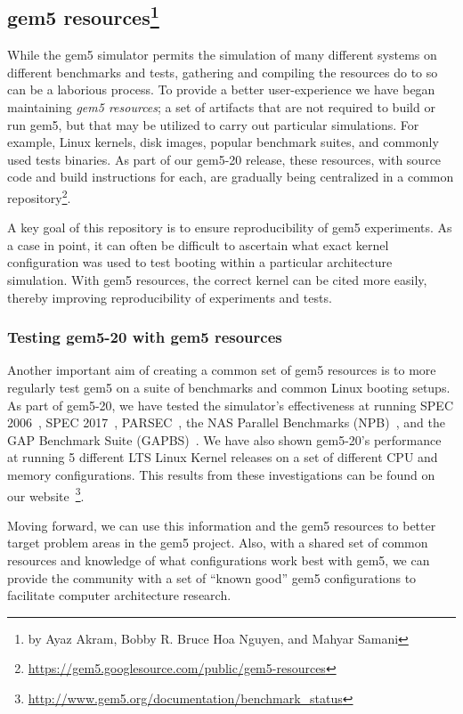 \subsection[gem5 resources]{gem5 resources\footnote{by Ayaz Akram, Bobby R. Bruce Hoa Nguyen, and Mahyar Samani}}
\label{sec:resources}

While the gem5 simulator permits the simulation of many different systems on
different benchmarks and tests, gathering and compiling the resources do to so
can be a laborious process. To provide
a better user-experience we have began maintaining \emph{gem5
resources}; a set of artifacts
that are not required to build or run gem5, but that may be utilized to carry out
particular simulations. For example, Linux kernels, disk images, popular
benchmark suites, and commonly used tests binaries. As part of our gem5-20
release, these resources, with source code and build instructions for each, are
gradually being centralized in a common repository\footnote{
\url{https://gem5.googlesource.com/public/gem5-resources}}.

A key goal of this repository is to ensure reproducibility of gem5
experiments. As a case in point, it can often be difficult to ascertain what exact
kernel configuration was used to test booting within a particular architecture
simulation. With gem5 resources, the correct kernel can be cited more easily,
thereby improving reproducibility of experiments and tests.

\subsubsection{Testing gem5-20 with gem5 resources}

Another important aim of creating a common set of gem5 resources is to more
regularly test gem5 on a suite of benchmarks and common Linux booting setups.
As part of gem5-20, we have tested the simulator's effectiveness
at running SPEC 2006~\cite{spec06}, SPEC 2017~\cite{spec17},
PARSEC~\cite{parsec}, the NAS Parallel Benchmarks (NPB)~\cite{npb},
and the GAP Benchmark Suite (GAPBS)~\cite{gapbs}. We have also shown gem5-20's
performance at running 5 different LTS Linux Kernel releases on a set of
different CPU and memory configurations. This results from these investigations
can be found on our website~\footnote{
\url{http://www.gem5.org/documentation/benchmark_status}}.

Moving forward, we can use this information and the gem5 resources to better target problem areas in the gem5 project.
Also, with a shared set of common resources and knowledge of what configurations work best with gem5, we can provide the community with a set of ``known good'' gem5 configurations to facilitate computer architecture research.

